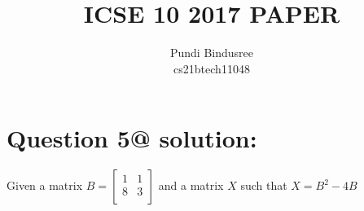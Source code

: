 \documentclass[journal, 11pt,twocolumn]{IEEEtran}
\begin{document}
\title{\huge ICSE 10 2017 PAPER}
\author{\Small Pundi Bindusree\\ \small cs21btech11048  }
\maketitle
\vspace{-12pt}

\section*{\Small Question 5@ solution:}

Given a matrix $ B = \begin{bmatrix}
1 & 1 \\
8 & 3 \\
\end{bmatrix} $
and a matrix \(X\) such that $X = B^2 - 4B $
\end{document}
